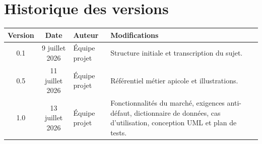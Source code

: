 \documentclass[11pt,a4paper]{report}
\begin{document}
\section*{Historique des versions}
\begin{center}
\begin{tabular}{ccp{3cm}p{6.5cm}}
\toprule
\textbf{Version} & \textbf{Date} & \textbf{Auteur} & \textbf{Modifications} \\
\midrule
0.1 & 9 juillet 2026 & Équipe projet & Structure initiale et transcription du sujet. \\
0.5 & 11 juillet 2026 & Équipe projet & Référentiel métier apicole et illustrations. \\
1.0 & 13 juillet 2026 & Équipe projet & Fonctionnalités du marché, exigences anti-défaut, dictionnaire de données, cas d'utilisation, conception UML et plan de tests. \\
\bottomrule
\end{tabular}
\end{center}
\clearpage














\appendix









\end{document}
